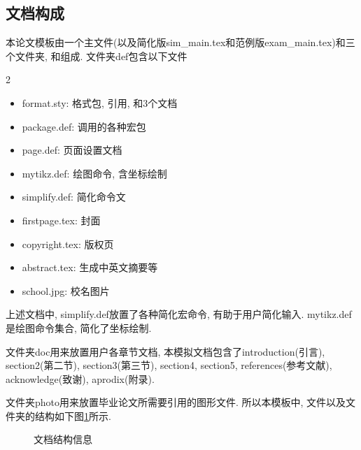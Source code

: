 \documentclass[a4paper,12pt,twoside]{ctexart}
\begin{document}
\subsection{文档构成}
    本论文模板由一个主文件(以及简化版sim\_main.tex和范例版exam\_main.tex)和三个文件夹, 和组成. 文件夹def包含以下文件
    \begin{multicols}{2}
    \begin{itemize}
      \item[1)] format.sty: 格式包, 引用, 和3个文档
      \item[2)] package.def: 调用的各种宏包
      \item[3)] page.def: 页面设置文档
      \item[4)] mytikz.def: 绘图命令, 含坐标绘制
      \item[5)] simplify.def: 简化命令文
      \item[6)] firstpage.tex: 封面
      \item[7)] copyright.tex: 版权页
      \item[8)] abstract.tex: 生成中英文摘要等
      \item[9)] school.jpg: 校名图片
    \end{itemize}
    \end{multicols}\noindent
    上述文档中, simplify.def放置了各种简化宏命令, 有助于用户简化输入. mytikz.def是绘图命令集合, 简化了坐标绘制.

    文件夹doc用来放置用户各章节文档, 本模拟文档包含了introduction(引言), section2(第二节), section3(第三节), section4, section5, references(参考文献), acknowledge(致谢), aprodix(附录).

    文件夹photo用来放置毕业论文所需要引用的图形文件. 所以本模板中, 文件以及文件夹的结构如下图\ref{fig1}所示.

    \begin{figure}[htb]\centering
    \caption{\label{fig1} 文档结构信息}
    \end{figure}
\end{document}
